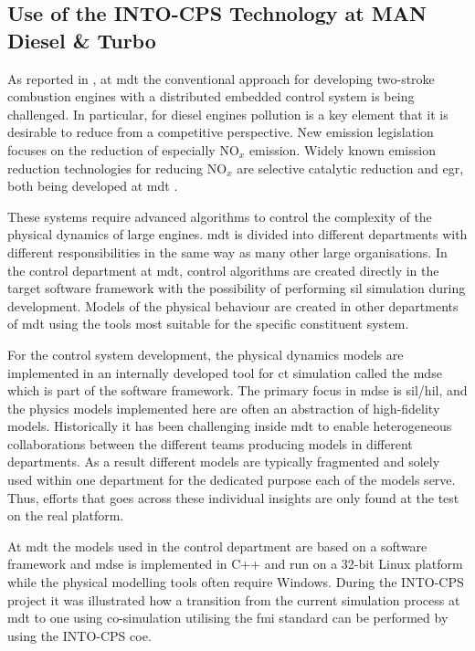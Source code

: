 \subsection{Use of the INTO-CPS Technology at MAN Diesel \& Turbo}

As reported in \cite{Pedersen&17}, at \ac{mdt} the conventional approach for
developing two-stroke combustion engines with a distributed embedded control
system is being challenged. In particular, for diesel engines pollution is a
key element that it is desirable to reduce from a competitive perspective. New
emission legislation focuses on the reduction of especially NO$_x$ emission.
Widely known emission reduction technologies for reducing NO$_x$ are selective
catalytic reduction and \ac{egr}, both being developed at \ac{mdt}
\cite{Pedersen&17}.

These systems require advanced algorithms to control the complexity of the
physical dynamics of large engines. \ac{mdt} is divided into different
departments with different responsibilities in the same way as many other large
organisations. In the control department at \ac{mdt}, control algorithms are
created directly in the target software framework with the possibility of
performing \ac{sil} simulation during development.  Models of the physical
behaviour are created in other departments of \ac{mdt} using the tools most
suitable for the specific constituent system.  

For the control system development, the physical dynamics models are
implemented in an internally developed tool for \ac{ct} simulation called the
\ac{mdse} which is part of the software framework. The primary focus in
\ac{mdse} is \ac{sil}/\ac{hil}, and the physics models implemented here are
often an abstraction of high-fidelity models. Historically it has been
challenging inside \ac{mdt} to enable heterogeneous collaborations between the
different teams producing models in different departments. As a result
different models are typically fragmented and solely used within one department
for the dedicated purpose each of the models serve. Thus, efforts that goes
across these individual insights are only found at the test on the real
platform.


At \ac{mdt} the models used in the control department are based on a software
framework and \ac{mdse} is implemented in C++ and run on a 32-bit Linux
platform while the physical modelling tools often require Windows. During the
INTO-CPS project it was illustrated how a transition from the current
simulation process at \ac{mdt} to one using co-simulation utilising the
\ac{fmi} standard can be performed by using the INTO-CPS  \ac{coe}. 

